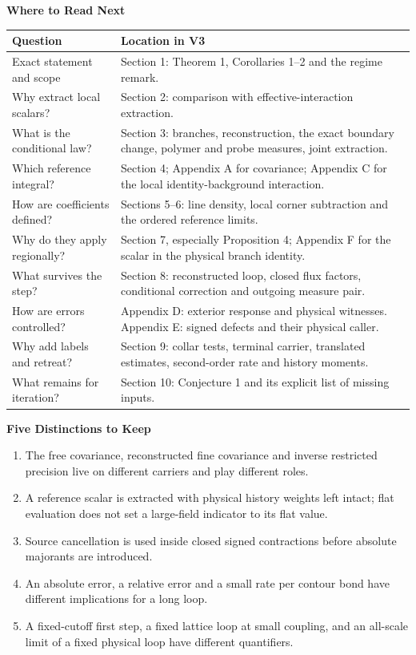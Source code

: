 \documentclass[11pt,a4paper]{article}
\newcommand{\subhead}[1]{\par\vspace{4pt}\textbf{\color{ink}#1}\par}
\begin{document}
\subhead{Where to Read Next}
\begin{small}
\begin{tabularx}{\textwidth}{@{}p{}X@{}}
    \toprule
    \textbf{Question} & \textbf{Location in V3}\\
    \midrule
    Exact statement and scope & Section 1: Theorem 1, Corollaries 1--2 and the regime remark.\\[3pt]
    Why extract local scalars? & Section 2: comparison with effective-interaction extraction.\\[3pt]
    What is the conditional law? & Section 3: branches, reconstruction, the exact boundary change, polymer and probe measures, joint extraction.\\[3pt]
    Which reference integral? & Section 4; Appendix A for covariance; Appendix C for the local identity-background interaction.\\[3pt]
    How are coefficients defined? & Sections 5--6: line density, local corner subtraction and the ordered reference limits.\\[3pt]
    Why do they apply regionally? & Section 7, especially Proposition 4; Appendix F for the scalar in the physical branch identity.\\[3pt]
    What survives the step? & Section 8: reconstructed loop, closed flux factors, conditional correction and outgoing measure pair.\\[3pt]
    How are errors controlled? & Appendix D: exterior response and physical witnesses. Appendix E: signed defects and their physical caller.\\[3pt]
    Why add labels and retreat? & Section 9: collar tests, terminal carrier, translated estimates, second-order rate and history moments.\\[3pt]
    What remains for iteration? & Section 10: Conjecture 1 and its explicit list of missing inputs.\\
    \bottomrule
\end{tabularx}
\end{small}

\subhead{Five Distinctions to Keep}
\begin{enumerate}
    \item The free covariance, reconstructed fine covariance and inverse restricted precision live on different carriers and play different roles.
    \item A reference scalar is extracted with physical history weights left intact; flat evaluation does not set a large-field indicator to its flat value.
    \item Source cancellation is used inside closed signed contractions before absolute majorants are introduced.
    \item An absolute error, a relative error and a small rate per contour bond have different implications for a long loop.
    \item A fixed-cutoff first step, a fixed lattice loop at small coupling, and an all-scale limit of a fixed physical loop have different quantifiers.
\end{enumerate}
\end{document}
